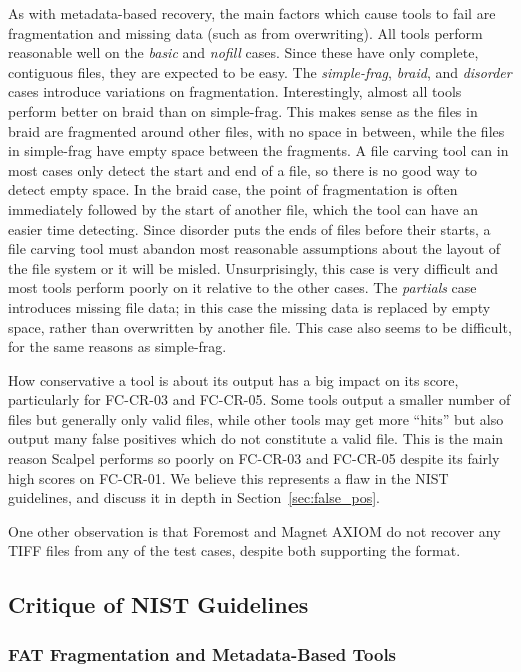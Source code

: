 As with metadata-based recovery, the main factors which cause tools to fail are fragmentation and missing data (such as from overwriting).
All tools perform reasonable well on the \emph{basic} and \emph{nofill} cases.
Since these have only complete, contiguous files, they are expected to be easy.
The \emph{simple-frag}, \emph{braid}, and \emph{disorder} cases introduce variations on fragmentation.
Interestingly, almost all tools perform better on braid than on simple-frag.
This makes sense as the files in braid are fragmented around other files, with no space in between, while the files in simple-frag have empty space between the fragments.
A file carving tool can in most cases only detect the start and end of a file, so there is no good way to detect empty space. 
In the braid case, the point of fragmentation is often immediately followed by the start of another file, which the tool can have an easier time detecting.
Since disorder puts the ends of files before their starts, a file carving tool must abandon most reasonable assumptions about the layout of the file system or it will be misled.
Unsurprisingly, this case is very difficult and most tools perform poorly on it relative to the other cases.
The \emph{partials} case introduces missing file data; in this case the missing data is replaced by empty space, rather than overwritten by another file.
This case also seems to be difficult, for the same reasons as simple-frag.

How conservative a tool is about its output has a big impact on its score, particularly for FC-CR-03 and FC-CR-05.
Some tools output a smaller number of files but generally only valid files, while other tools may get more ``hits'' but also output many false positives which do not constitute a valid file.
This is the main reason Scalpel performs so poorly on FC-CR-03 and FC-CR-05 despite its fairly high scores on FC-CR-01.
We believe this represents a flaw in the NIST guidelines, and discuss it in depth in Section~\ref{sec:false_pos}.

One other observation is that Foremost and Magnet AXIOM do not recover any TIFF files from any of the test cases, despite both supporting the format.


\subsection{Critique of NIST Guidelines}
\subsubsection{FAT Fragmentation and Metadata-Based Tools}

